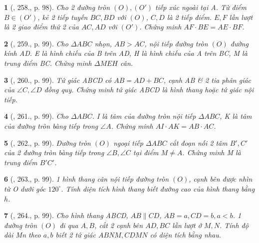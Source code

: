 \documentclass{article}
\newtheorem{baitoan}{}
\begin{document}
\begin{baitoan}[\cite{Binh_Toan_9_tap_2}, 258., p. 98]
	Cho 2 đường tròn $(O),(O')$ tiếp xúc ngoài tại A. Từ điểm $B\in(O')$, kẻ 2 tiếp tuyến $BC,BD$ với $(O)$, $C,D$ là 2 tiếp điểm. $E,F$ lần lượt là 2 giao điểm thứ 2 của $AC,AD$ với $(O')$. Chứng minh $AF\cdot BE = AE\cdot BF$.
\end{baitoan}

\begin{baitoan}[\cite{Binh_Toan_9_tap_2}, 259., p. 99]
	Cho $\Delta ABC$ nhọn, $AB > AC$, nội tiếp đường tròn $(O)$ đường kính AD. E là hình chiếu của B trên AD, H là hình chiếu của A trên BC, M là trung điểm BC. Chứng minh $\Delta MEH$ cân.
\end{baitoan}

\begin{baitoan}[\cite{Binh_Toan_9_tap_2}, 260., p. 99]
	Tứ giác ABCD có $AB = AD + BC$, cạnh AB \& 2 tia phân giác của $\angle{C},\angle{D}$ đồng quy. Chứng minh tứ giác ABCD là hình thang hoặc tứ giác nội tiếp.
\end{baitoan}

\begin{baitoan}[\cite{Binh_Toan_9_tap_2}, 261., p. 99]
	Cho $\Delta ABC$. I là tâm của đường tròn nội tiếp $\Delta ABC$, K là tâm của đường tròn bàng tiếp trong $\angle{A}$. Chứng minh $AI\cdot AK = AB\cdot AC$.
\end{baitoan}

\begin{baitoan}[\cite{Binh_Toan_9_tap_2}, 262., p. 99]
	Đường tròn $(O)$ ngoại tiếp $\Delta ABC$ cắt đoạn nối 2 tâm $B',C'$ của 2 đường tròn bàng tiếp trong $\angle{B},\angle{C}$ tại điểm $M\ne A$. Chứng minh M là trung điểm $B'C'$.
\end{baitoan}

\begin{baitoan}[\cite{Binh_Toan_9_tap_2}, 263., p. 99]
	1 hình thang cân nội tiếp đường tròn $(O)$, cạnh bên được nhìn từ O dưới góc $120^\circ$. Tính diện tích hình thang biết đường cao của hình thang bằng $h$.
\end{baitoan}

\begin{baitoan}[\cite{Binh_Toan_9_tap_2}, 264., p. 99]
	Cho hình thang ABCD, $AB\parallel CD$, $AB = a,CD = b,a < b$. 1 đường tròn $(O)$ đi qua $A,B$, cắt 2 cạnh bên $AD,BC$ lần lượt ở $M,N$. Tính độ dài Mn theo $a,b$ biết 2 tứ giác $ABNM,CDMN$ có diện tích bằng nhau.
\end{baitoan}
\end{document}
